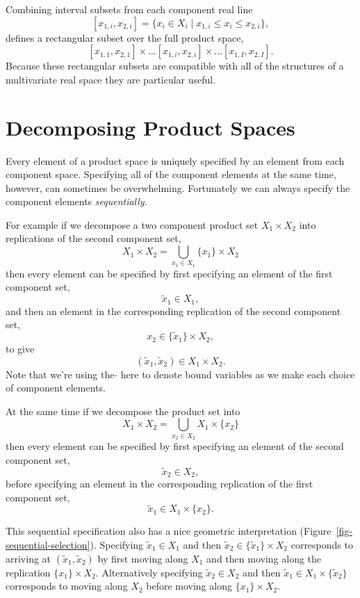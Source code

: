 \documentclass[
  letterpaper,
  DIV=11,
  numbers=noendperiod]{scrartcl}
\begin{document}
Combining interval subsets from each component real line \[
[ x_{1, i}, x_{2, i} ] =
\{ x_{i} \in X_{i} \mid x_{1, i} \le x_{i} \le x_{2, i} \},
\] defines a rectangular subset over the full product space, \[
[ x_{1, 1}, x_{2, 1} ] \times \ldots
[ x_{1, i}, x_{2, i} ] \times \ldots
[ x_{1, I}, x_{2, I} ].
\] Because these rectangular subsets are compatible with all of the
structures of a multivariate real space they are particular useful.

\hypertarget{sec:decomposition}{%
\section{Decomposing Product Spaces}\label{sec:decomposition}}

Every element of a product space is uniquely specified by an element
from each component space. Specifying all of the component elements at
the same time, however, can sometimes be overwhelming. Fortunately we
can always specify the component elements \emph{sequentially}.

For example if we decompose a two component product set
\(X_{1} \times X_{2}\) into replications of the second component set, \[
X_{1} \times X_{2} = \bigcup_{x_{1} \in X_{1} } \{ x_{1} \} \times X_{2}
\] then every element can be specified by first specifying an element of
the first component set, \[
\tilde{x}_{1} \in X_{1},
\] and then an element in the corresponding replication of the second
component set, \[
x_{2} \in \{ \tilde{x}_{1} \} \times X_{2},
\] to give \[
(\tilde{x}_{1}, \tilde{x}_{2}) \in X_{1} \times X_{2}.
\] Note that we're using the \(\tilde{}\) here to denote bound variables
as we make each choice of component elements.

At the same time if we decompose the product set into \[
X_{1} \times X_{2} = \bigcup_{x_{2} \in X_{2} } X_{1} \times \{ x_{2} \}
\] then every element can be specified by first specifying an element of
the second component set, \[
\tilde{x}_{2} \in X_{2},
\] before specifying an element in the corresponding replication of the
first component set, \[
\tilde{x}_{1} \in X_{1} \times \{ x_{2} \}.
\]

This sequential specification also has a nice geometric interpretation
(Figure~\ref{fig-sequential-selection}). Specifying
\(\tilde{x}_{1} \in X_{1}\) and then
\(\tilde{x}_{2} \in \{ \tilde{x}_{1} \} \times X_{2}\) corresponds to
arriving at \((\tilde{x}_{1}, \tilde{x}_{2})\) by first moving along
\(X_{1}\) and then moving along the replication
\(\{ x_{1} \} \times X_{2}\). Alternatively specifying
\(\tilde{x}_{2} \in X_{2}\) and then
\(\tilde{x}_{1} \in X_{1} \times \{ \tilde{x}_{2} \}\) corresponds to
moving along \(X_{2}\) before moving along \(\{ x_{1} \} \times X_{2}\).
\end{document}
